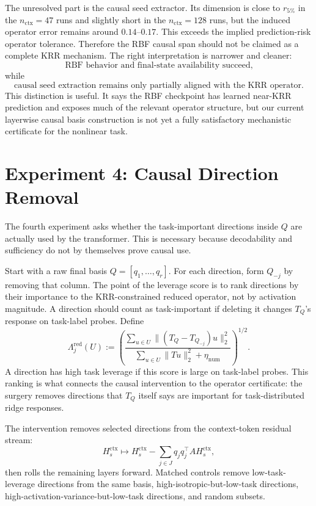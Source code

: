 \documentclass[11pt]{article}
\begin{document}
The unresolved part is the causal seed extractor. Its dimension is close to \(r_{5\%}\) in the
\(n_{\mathrm{ctx}}=47\) runs and slightly short in the \(n_{\mathrm{ctx}}=128\) runs, but the induced
operator error remains around \(0.14\)--\(0.17\). This exceeds the implied prediction-risk operator
tolerance. Therefore the RBF causal span should not be claimed as a complete KRR mechanism. The
right interpretation is narrower and cleaner:
\[
\text{RBF behavior and final-state availability succeed,}
\]
while
\[
\text{causal seed extraction remains only partially aligned with the KRR operator.}
\]
This distinction is useful. It says the RBF checkpoint has learned near-KRR prediction and exposes
much of the relevant operator structure, but our current layerwise causal basis construction is not
yet a fully satisfactory mechanistic certificate for the nonlinear task.

\section{Experiment 4: Causal Direction Removal}

The fourth experiment asks whether the task-important directions inside \(Q\) are actually used by
the transformer. This is necessary because decodability and sufficiency do not by themselves prove
causal use.

Start with a raw final basis \(Q=[q_1,\ldots,q_r]\). For each direction, form \(Q_{-j}\) by removing
that column. The point of the leverage score is to rank directions by their importance to the
KRR-constrained reduced operator, not by activation magnitude. A direction should count as
task-important if deleting it changes \(T_Q\)'s response on task-label probes. Define
\[
\Lambda_j^{\mathrm{red}}(U)
:=
\left(
\frac{
\sum_{u\in U}\|(T_Q-T_{Q_{-j}})u\|_2^2
}{
\sum_{u\in U}\|Tu\|_2^2+\eta_{\mathrm{num}}
}
\right)^{1/2}.
\]
A direction has high task leverage if this score is large on task-label probes. This ranking is what
connects the causal intervention to the operator certificate: the surgery removes directions that
\(T_Q\) itself says are important for task-distributed ridge responses.

The intervention removes selected directions from the context-token residual stream:
\[
H_s^{\mathrm{ctx}}
\longmapsto
H_s^{\mathrm{ctx}}
-
\sum_{j\in J}q_jq_j^\top A H_s^{\mathrm{ctx}},
\]
then rolls the remaining layers forward. Matched controls remove low-task-leverage directions from
the same basis, high-isotropic-but-low-task directions, high-activation-variance-but-low-task
directions, and random subsets.
\end{document}
